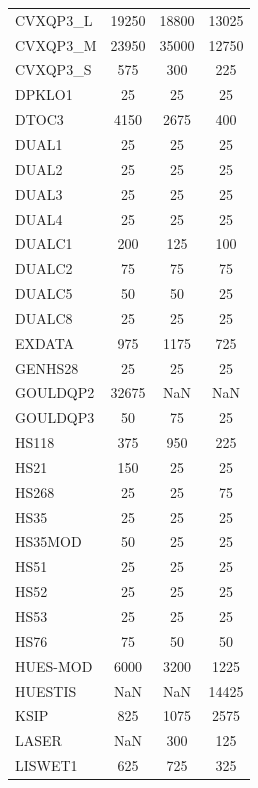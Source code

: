 \begin{longtable}{lccc}
CVXQP3\_L &    19250 &    18800 &    13025 \\
CVXQP3\_M &    23950 &    35000 &    12750 \\
CVXQP3\_S &      575 &      300 &      225 \\
DPKLO1   &       25 &       25 &       25 \\
DTOC3    &     4150 &     2675 &      400 \\
DUAL1    &       25 &       25 &       25 \\
DUAL2    &       25 &       25 &       25 \\
DUAL3    &       25 &       25 &       25 \\
DUAL4    &       25 &       25 &       25 \\
DUALC1   &      200 &      125 &      100 \\
DUALC2   &       75 &       75 &       75 \\
DUALC5   &       50 &       50 &       25 \\
DUALC8   &       25 &       25 &       25 \\
EXDATA   &      975 &     1175 &      725 \\
GENHS28  &       25 &       25 &       25 \\
GOULDQP2 &    32675 &      NaN &      NaN \\
GOULDQP3 &       50 &       75 &       25 \\
HS118    &      375 &      950 &      225 \\
HS21     &      150 &       25 &       25 \\
HS268    &       25 &       25 &       75 \\
HS35     &       25 &       25 &       25 \\
HS35MOD  &       50 &       25 &       25 \\
HS51     &       25 &       25 &       25 \\
HS52     &       25 &       25 &       25 \\
HS53     &       25 &       25 &       25 \\
HS76     &       75 &       50 &       50 \\
HUES-MOD &     6000 &     3200 &     1225 \\
HUESTIS  &      NaN &      NaN &    14425 \\
KSIP     &      825 &     1075 &     2575 \\
LASER    &      NaN &      300 &      125 \\
LISWET1  &      625 &      725 &      325 \\

\end{longtable}

